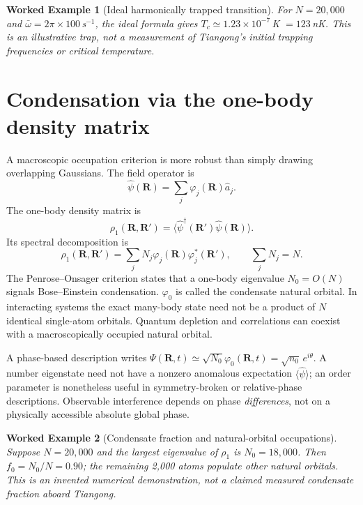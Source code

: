 \documentclass[11pt,a4paper]{article}
\newtheorem{example}{Worked Example}
\newcommand{\ph}{\varphi}
\begin{document}
\begin{example}[Ideal harmonically trapped transition]
For $N=20{,}000$ and $\bar\omega=2\pi\times100\,$s$^{-1}$, the ideal formula gives $T_c\simeq1.23\times10^{-7}\,$K $=123\,$nK. This is an illustrative trap, not a measurement of Tiangong's initial trapping frequencies or critical temperature.
\end{example}

\section{Condensation via the one-body density matrix}
A macroscopic occupation criterion is more robust than simply drawing overlapping Gaussians. The field operator is
\begin{equation}
\hat\psi(\mathbf R)=\sum_j\ph_j(\mathbf R)\hat a_j.
\end{equation}
The one-body density matrix is
\begin{equation}
\rho_1(\mathbf R,\mathbf R')=\langle\hat\psi^\dagger(\mathbf R')\hat\psi(\mathbf R)\rangle.
\end{equation}
Its spectral decomposition is
\begin{equation}
\rho_1(\mathbf R,\mathbf R')=\sum_j N_j\ph_j(\mathbf R)\ph_j^*(\mathbf R'),\qquad\sum_jN_j=N.
\end{equation}
The Penrose--Onsager criterion states that a one-body eigenvalue $N_0=O(N)$ signals Bose--Einstein condensation. $\ph_0$ is called the condensate natural orbital. In interacting systems the exact many-body state need not be a product of $N$ identical single-atom orbitals. Quantum depletion and correlations can coexist with a macroscopically occupied natural orbital.

A phase-based description writes $\Psi(\mathbf R,t)\simeq\sqrt{N_0}\ph_0(\mathbf R,t)=\sqrt{n_0}\,e^{i\theta}$. A number eigenstate need not have a nonzero anomalous expectation $\langle\hat\psi\rangle$; an order parameter is nonetheless useful in symmetry-broken or relative-phase descriptions. Observable interference depends on phase \emph{differences}, not on a physically accessible absolute global phase.

\begin{example}[Condensate fraction and natural-orbital occupations]
Suppose $N=20{,}000$ and the largest eigenvalue of $\rho_1$ is $N_0=18{,}000$. Then $f_0=N_0/N=0.90$; the remaining 2,000 atoms populate other natural orbitals. This is an invented numerical demonstration, not a claimed measured condensate fraction aboard Tiangong.
\end{example}
\end{document}
